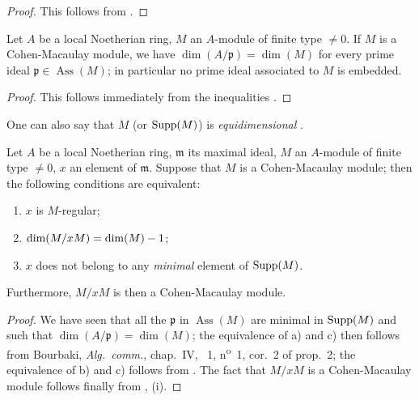 \begin{proof}
This follows from .
\end{proof}

\begin{proposition}[16.5.4]
\label{0.16.5.4}
Let $A$ be a local Noetherian ring, $M$ an $A$-module of finite type $\neq 0$.
If $M$ is a Cohen-Macaulay module, we have $\dim(A/\mathfrak{p})=\dim(M)$ for every prime ideal $\mathfrak{p}\in\operatorname{Ass}(M)$; in particular no prime ideal associated to $M$ is embedded.
\end{proposition}

\begin{proof}
This follows immediately from the inequalities .
\end{proof}

One can also say that $M$ (or $\operatorname{Supp}(M)$) is \emph{equidimensional} .


\begin{proposition}[16.5.5]
\label{0.16.5.5}
Let $A$ be a local Noetherian ring, $\mathfrak{m}$ its maximal ideal, $M$ an $A$-module of finite type $\neq 0$, $x$ an element of $\mathfrak{m}$.
Suppose that $M$ is a Cohen-Macaulay module; then the following conditions are equivalent:
\begin{enumerate}
  \item[\textup{a)}] $x$ is $M$-regular;
  \item[\textup{b)}] $\dim(M/x M)=\dim(M)- 1$;
  \item[\textup{c)}] $x$ does not belong to any \emph{minimal} element of $\operatorname{Supp}(M)$.
\end{enumerate}
Furthermore, $M/x M$ is then a Cohen-Macaulay module.
\end{proposition}

\begin{proof}
We have seen  that all the $\mathfrak{p}$ in $\operatorname{Ass}(M)$ are minimal in $\operatorname{Supp}(M)$ and such that $\dim(A/\mathfrak{p})=\dim(M)$; the equivalence of a) and c) then follows from Bourbaki, \emph{Alg.~comm.}, chap.~IV, \textsection~1, n\textsuperscript{o}~1, cor.~2 of prop.~2; the equivalence of b) and c) follows from .
The fact that $M/x M$ is a Cohen-Macaulay module follows finally from , (i).
\end{proof}

